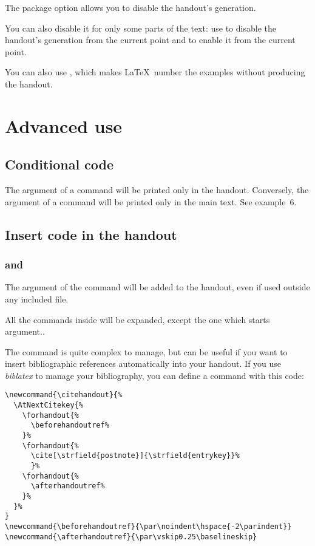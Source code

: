 \documentclass{ltxdockit}[2011/03/25]
\begin{document}
The package option  allows you to disable the handout's generation.

\label{enablehandout}You can also disable it for only some parts of the text: use  to disable the handout's generation from the current point and  to enable it from the current point.

\label{printing} You can also use , which makes \LaTeX\ number the examples without producing the handout.

\section{Advanced use}
\subsection{Conditional code}

The argument of a   command will be printed only in the handout. Conversely, the argument of a command  will be printed only in the main text. See example~6.

\subsection{Insert code in the handout}
\subsubsection{ and }\label{forhandout}
The argument of the   command will be added to the handout, even if used outside any included file.

All the commands inside will be expanded, except the one which starts argument..


The  command is quite complex to manage, but can be useful if you want to insert bibliographic references automatically into your handout. If you use \emph{biblatex} to manage your bibliography, you can define a  command with this code:


\begin{verbatim}
\newcommand{\citehandout}{%
  \AtNextCitekey{%
    \forhandout{%
      \beforehandoutref%
    }%
    \forhandout{%
      \cite[\strfield{postnote}]{\strfield{entrykey}}%
      }%
    \forhandout{%
      \afterhandoutref%
    }%
  }%
}
\newcommand{\beforehandoutref}{\par\noindent\hspace{-2\parindent}}
\newcommand{\afterhandoutref}{\par\vskip0.25\baselineskip}
\end{verbatim}
\end{document}
